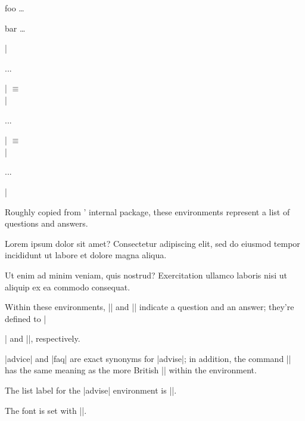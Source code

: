 \documentclass{ltxguidex}
\begin{document}
\begin{LTXexample}
\begin{options}
    \item[foo] \dots
    \item[bar] \dots
\end{options}
\end{LTXexample}

\begin{desc}
|\begin{advise}...\end{advise}| $\equiv$\\
|\begin{advice}...\end{advice}| $\equiv$\\
|\begin{faq}...\end{faq}|\\
\end{desc}

Roughly copied from ' internal  package,
these environments represent a list of questions and answers.

\begin{LTXexample}
\begin{faq}
\Q Lorem ipsum dolor sit amet?
\A Consectetur adipiscing elit, sed do eiusmod tempor incididunt ut labore et dolore magna aliqua.

\Q Ut enim ad minim veniam, quis nostrud?
\A Exercitation ullamco laboris nisi ut aliquip ex ea commodo consequat.
\end{faq}
\end{LTXexample}

Within these environments, |\Q| and |\A| indicate a question and an answer;
they're defined to |\item| and |\advisespace|, respectively.

\begin{note}
	|advice| and |faq| are exact synonyms for |advise|; in addition, the
	command |\advicespace| has the same meaning as the more British
	|\advisespace| within the environment.

	The list label for the |advise| environment is ||.

	The font is set with |\advisestyle|.
\end{note}
\end{document}
